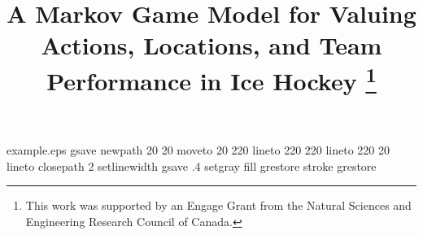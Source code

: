 %

%
%
%
%
%
\begin{filecontents*}{example.eps}
gsave
newpath
  20 20 moveto
  20 220 lineto
  220 220 lineto
  220 20 lineto
closepath
2 setlinewidth
gsave
  .4 setgray fill
grestore
stroke
grestore
\end{filecontents*}
%
\RequirePackage{fix-cm}
%
\documentclass[smallextended]{svjour3}       %
%
\smartqed  %
%
\usepackage{graphicx}
\usepackage{multirow}

%
%
%
%
%

\usepackage{booktabs} 
\usepackage{times}
\usepackage{url}
\usepackage[square]{natbib}
\usepackage{varwidth}



\title{A Markov Game Model for Valuing  Actions, Locations, and Team Performance in Ice Hockey
\thanks{This work was supported by an Engage Grant from the Natural Sciences and Engineering Research Council of Canada.}
}

